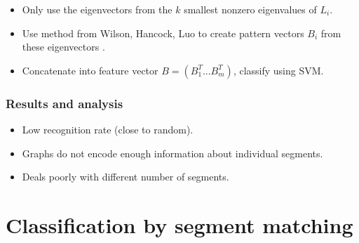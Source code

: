 \documentclass{beamer}
\begin{document}
\begin{frame}
\begin{itemize}
\item Only use the eigenvectors from the $k$ smallest nonzero eigenvalues of $L_i$.
\item Use method from Wilson, Hancock, Luo to create pattern vectors $B_i$ from these eigenvectors \cite{wilson2005pattern}.
\item Concatenate into feature vector $B = (B_1^T ... B_m^T)$, classify using SVM.
\end{itemize}
\end{frame}

\begin{frame}
\frametitle{Results and analysis}
\begin{itemize}
\item Low recognition rate (close to random).
\item Graphs do not encode enough information about individual segments.
\item Deals poorly with different number of segments.
\end{itemize}
\end{frame}

\section{Classification by segment matching}
\end{document}
